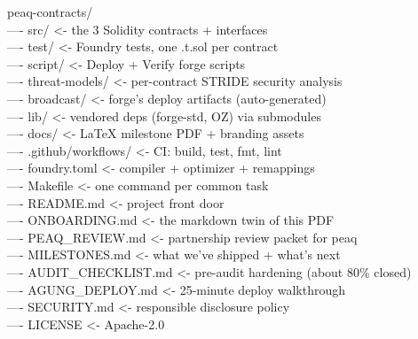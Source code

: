 \documentclass[11pt,a4paper]{article}
\begin{document}
\begin{codebox}
peaq-contracts/\\
\textbar---- src/                       \textcolor{axigray}{<- the 3 Solidity contracts + interfaces}\\
\textbar---- test/                      \textcolor{axigray}{<- Foundry tests, one .t.sol per contract}\\
\textbar---- script/                    \textcolor{axigray}{<- Deploy + Verify forge scripts}\\
\textbar---- threat-models/             \textcolor{axigray}{<- per-contract STRIDE security analysis}\\
\textbar---- broadcast/                 \textcolor{axigray}{<- forge's deploy artifacts (auto-generated)}\\
\textbar---- lib/                       \textcolor{axigray}{<- vendored deps (forge-std, OZ) via submodules}\\
\textbar---- docs/                      \textcolor{axigray}{<- LaTeX milestone PDF + branding assets}\\
\textbar---- .github/workflows/         \textcolor{axigray}{<- CI: build, test, fmt, lint}\\
\textbar---- foundry.toml               \textcolor{axigray}{<- compiler + optimizer + remappings}\\
\textbar---- Makefile                   \textcolor{axigray}{<- one command per common task}\\
\textbar---- README.md                  \textcolor{axigray}{<- project front door}\\
\textbar---- ONBOARDING.md              \textcolor{axigray}{<- the markdown twin of this PDF}\\
\textbar---- PEAQ\_REVIEW.md             \textcolor{axigray}{<- partnership review packet for peaq}\\
\textbar---- MILESTONES.md              \textcolor{axigray}{<- what we've shipped + what's next}\\
\textbar---- AUDIT\_CHECKLIST.md         \textcolor{axigray}{<- pre-audit hardening (about 80\% closed)}\\
\textbar---- AGUNG\_DEPLOY.md            \textcolor{axigray}{<- 25-minute deploy walkthrough}\\
\textbar---- SECURITY.md                \textcolor{axigray}{<- responsible disclosure policy}\\
\textbar---- LICENSE                    \textcolor{axigray}{<- Apache-2.0}
\end{codebox}
\end{document}
